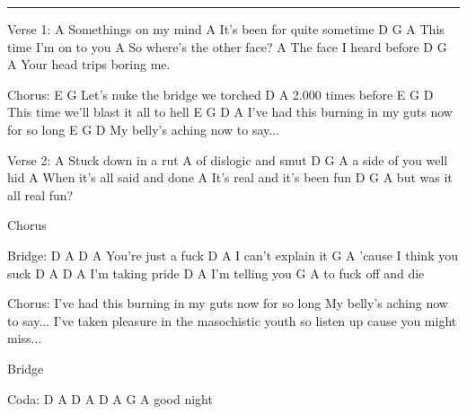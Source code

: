 \noindent\rule{\columnwidth}{1pt}

\begin{multicols}{2}
\begin{lstsong}
Verse 1:
A 
Somethings on my mind 
A 
It's been for quite sometime 
     D        G     A 
This time I'm on to you 
A 
So where's the other face? 
A 
The face I heard before 
     D          G      A 
Your head trips boring me.

Chorus:
E               G         
 Let's nuke the bridge we torched  
D           A 
2.000 times before 
E               G                D    
This time we'll blast it all to hell 
E              G             D              A
I've had this burning in my guts now for so long 
E           G              D  
 My belly's aching now to say...

Verse 2: 
A 
Stuck down in a rut 
A 
of dislogic and smut 
   D       G       A   
a side of you well hid 
A 
When it's all said and done 
A 
It's real and it's been fun 
    D      G        A  
but was it all real fun?
\end{lstsong}\vfill\columnbreak\begin{lstsong}
Chorus 

Bridge:
D       A    D  A
You're just  a fuck
D   A
I can't explain it
       G           A
'cause I think you suck
D     A    D  A
I'm taking pride
D     A
I'm telling you
        G       A
to fuck off and die

Chorus:
I've had this burning in my guts now for so long 
My belly's aching now to say...
I've taken pleasure in the masochistic youth
so listen up cause you might miss...

Bridge

Coda:
D A D A D A G A
good night
\end{lstsong}
\end{multicols}
\newpage


